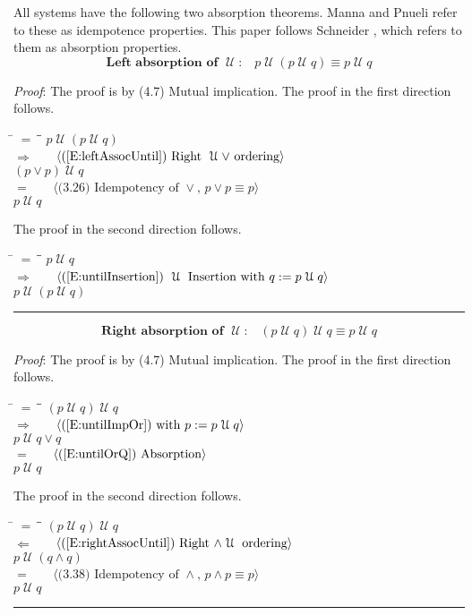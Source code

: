 \documentclass[12pt, fleqn, leqno]{article}
\newcommand{\lgap}{2pt}                             %
\newcommand{\mymathindent}{24pt}                    %
\newcommand{\impl}{\ensuremath{\Rightarrow}}        %
\newcommand{\foll}{\ensuremath{\Leftarrow}}         %
\newcommand{\Until}{\;\mathcal{U}\;}
\newcommand{\myqed}{\rule[-.23ex]{1.2ex}{2.0ex}}
\newcommand{\myqedtab}{\hspace{384pt}}              %
\newcommand{\Gll} {\langle}                         %
\newcommand{\Ggg} {\rangle}                         %
\newcommand{\Hint}[1]     {\ \ \ $\Gll              \mbox{#1} \Ggg$ }   %
\begin{document}
All systems have the following two absorption theorems.
Manna and Pnueli \cite{Manna} refer to these as idempotence properties.
This paper follows Schneider \cite{Schn}, which refers to them as absorption properties.
\begin{equation}\label{E:untilIdem}
\textbf{Left absorption of $\Until$:}\quad p \Until (p \Until q) \equiv p \Until q
\end{equation}

\emph{Proof}: The proof is by (4.7) Mutual implication.
The proof in the first direction follows.
\begin{tabbing}
\hspace{\mymathindent} \= $= \;$ \= \myqedtab \= \kill
\> \> $p \Until (p \Until q)$\\[\lgap]
\> $\impl$ \> \Hint{(\ref{E:leftAssocUntil})  Right $\Until \lor$ ordering} \\[\lgap]
\> \> $(p\lor p) \Until q$\\[\lgap]
\> $=$ \> \Hint{(3.26) Idempotency of $\lor$, $p \lor p \equiv p$} \\[\lgap]
\> \> $p \Until q$ \\
\end{tabbing}
The proof in the second direction follows.
\begin{tabbing}
\hspace{\mymathindent} \= $= \;$ \= \myqedtab \= \kill
\> \> $p \Until q$\\[\lgap]
\> $\impl$ \> \Hint{(\ref{E:untilInsertion}) $\Until$ Insertion with $q:=p\Until q$} \\[\lgap]
\> \> $p \Until (p \Until q)$ \quad \myqed
\end{tabbing}
\begin{equation}\label{E:untilIdemR}
\textbf{Right absorption of $\Until$:}\quad (p \Until q) \Until q \equiv p \Until q
\end{equation}

\emph{Proof}: The proof is by (4.7) Mutual implication.
The proof in the first direction follows.
\begin{tabbing}
\hspace{\mymathindent} \= $= \;$ \= \myqedtab \= \kill
\> \> $(p \Until q) \Until q$\\[\lgap]
\> $\impl$ \> \Hint{(\ref{E:untilImpOr}) with $p:=p\Until q$} \\[\lgap]
\> \> $p \Until q \lor q$\\[\lgap]
\> $=$ \> \Hint{(\ref{E:untilOrQ}) Absorption} \\[\lgap]
\> \> $p\Until q$
\end{tabbing}
The proof in the second direction follows.
\begin{tabbing}
\hspace{\mymathindent} \= $= \;$ \= \myqedtab \= \kill
\> \> $(p \Until q) \Until q$\\[\lgap]
\> $\foll$ \> \Hint{(\ref{E:rightAssocUntil}) Right $\land \Until$ ordering} \\[\lgap]
\> \> $p \Until (q \land q)$\\[\lgap]
\> $=$  \>  \Hint{(3.38) Idempotency of $\land$, $p\land p \equiv p$}\\[\lgap]
\> \> $p \Until q$ \quad \myqed
\end{tabbing}
\end{document}
